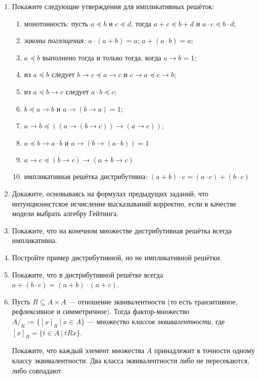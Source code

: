 \documentclass[10pt,a4paper,oneside]{article}
\begin{document}
\begin{enumerate}
\item Покажите следующие утверждения для импликативных решёток:
\begin{enumerate}
\item монотонность: пусть $a \preceq b$ и $c \preceq d$, тогда $a + c \preceq b + d$ и $a \cdot c \preceq b \cdot d$;
\item \emph{законы поглощения:} $a \cdot (a + b) = a$; $a + (a \cdot b) = a$;
\item $a \preceq b$ выполнено тогда и только тогда, когда $a \rightarrow b = 1$;
\item из $a \preceq b$ следует $b\rightarrow c \preceq a\rightarrow c$ и $c\rightarrow a \preceq c \rightarrow b$;
\item из $a \preceq b \rightarrow c$ следует $a \cdot b \preceq c$;
\item $b \preceq a \rightarrow b$ и $a \rightarrow (b \rightarrow a) = 1$;
\item $a \rightarrow b \preceq ((a \rightarrow (b \rightarrow c)) \rightarrow (a \rightarrow c))$;
\item $a \preceq b \rightarrow a \cdot b$ и $a \rightarrow (b \rightarrow (a \cdot b)) = 1$
\item $a \rightarrow c \preceq (b \rightarrow c) \rightarrow (a + b \rightarrow c)$
\item импликативная решётка дистрибутивна: $(a + b) \cdot c = (a \cdot c) + (b \cdot c)$
\end{enumerate}

\item Докажите, основываясь на формулах предыдущих заданий, что интуиционистское исчисление высказываний
корректно, если в качестве модели выбрать алгебру Гейтинга.

\item Покажите, что на конечном множестве дистрибутивная решётка всегда импликативна.
\item Постройте пример дистрибутивной, но не импликативной решётки.
\item Покажите, что в дистрибутивной решётке всегда $a + (b \cdot c) = (a + b) \cdot (a + c)$.

\item Пусть $R \subseteq A\times A$ --- отношение эквивалентности (то есть транзитивное, рефлексивное и симметричное).
Тогда фактор-множество $A/_R := \{ [ x ]_R\ |\ x \in A\}$ --- множество \emph{классов эквивалентности},
где $[x]_R = \{ t\in A\ |\ tRx\}$.

Покажите, что каждый элемент множества $A$ принадлежит в точности одному классу эквивалентности. Два класса эквивалентности либо не пересекаются, либо совпадают.


\end{enumerate}
\end{document}
